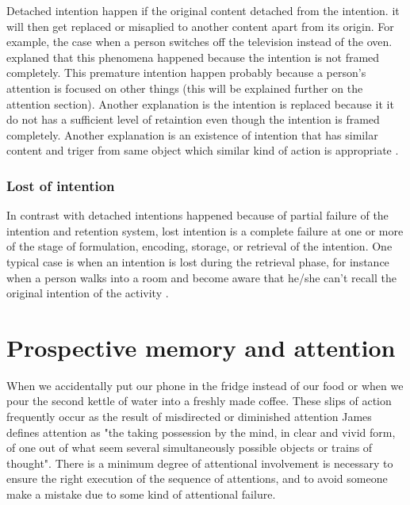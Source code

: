 Detached intention happen if the original content detached from the intention. it will then get replaced or misaplied to another content apart from
its origin.
 For example, the case when a person switches off the television instead of the oven. \citep{Reason1984} explaned that this phenomena happened because the intention is not framed completely.
This premature intention happen probably because a person's attention is focused on other things (this will be explained further on the attention section). Another explanation is the intention
is replaced because it it do not has a sufficient level of retaintion even though the intention is framed completely.
 Another explanation is an existence of intention that has similar content and triger from same object which similar kind of action is appropriate \citep{Reason1984}.


\subsubsection{Lost of intention}

In contrast with detached intentions happened because of partial failure of the intention and retention system, lost intention
is a complete failure at one or more of the stage of formulation, encoding, storage, or retrieval of the intention.
One typical case is when an intention is lost during the retrieval phase, for instance when a person walks into a room and become aware that he/she can't recall the original intention of the activity \citep{Reason1984}.


\section{Prospective memory and attention}


When we accidentally put our phone in the fridge instead of our food or when we pour the second kettle of water into a freshly made coffee. These slips of action frequently occur as the result of misdirected or diminished attention \cite{Reason1984}
James defines attention as  "the taking possession by the mind, in clear and vivid form, of one out of what seem several simultaneously possible objects or trains of thought".
There is a minimum degree of attentional involvement is necessary to ensure the right execution of the sequence of attentions, and to avoid someone make a mistake due to some kind of attentional failure.

